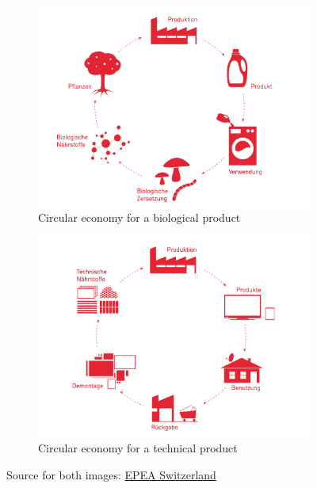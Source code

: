 \documentclass[11pt]{article}
\theoremstyle{definition}
\begin{document}
\begin{figure}[H]
	\begin{subfigure}[b]{0.48\linewidth}
		\centering
		\includegraphics[width=\linewidth]{img/circular_economy_biological.png}
		\caption{Circular economy for a biological product}
	\end{subfigure}
	\hfill
	\begin{subfigure}[b]{0.48\linewidth}
		\centering
		\includegraphics[width=\linewidth]{img/circular_economy_technical.png}
		\caption{Circular economy for a technical product}
	\end{subfigure}
	\caption{Source for both images: \href{https://epeaswitzerland.com/cradle-to-cradle/}{EPEA Switzerland}}
\end{figure}
\end{document}
